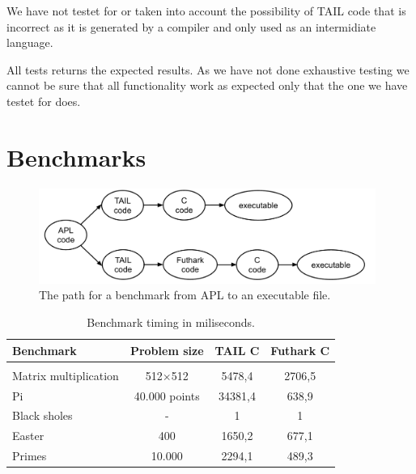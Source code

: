 \documentclass[11pt]{article}
\begin{document}
We have not testet for or taken into account the possibility of TAIL code that is incorrect as it is generated by a compiler and only used as an intermidiate language. 

All tests returns the expected results. 
As we have not done exhaustive testing we cannot be sure that all functionality work as expected only that the one we have testet for does. 

\section{Benchmarks}
\label{sec:benchmarks}
\begin{figure}
\label{fig:code}
\begin{center}
    \includegraphics[width=11cm]{code.png}
    \caption{The path for a benchmark from APL to an executable file.}
\end{center}
\end{figure}

\begin{table} 
\begin{center}
\label{tbl:benchmark}
\begin{tabular}{l c c c}
Benchmark & Problem size & TAIL C & Futhark C \\ \hline \\
Matrix multiplication    & 512$\times$512 &  5478,4     & 2706,5  \\
Pi		     	         & 40.000 points     &  34381,4   & 638,9 \\
Black sholes               & - 			    & 1               & 1 \\
Easter                         & 400 		    & 1650,2      & 677,1 \\
Primes                        & 10.000                & 2294,1      & 489,3 \\
\end{tabular}
\caption{Benchmark timing in miliseconds.}
\end{center}
\end{table}
\end{document}
